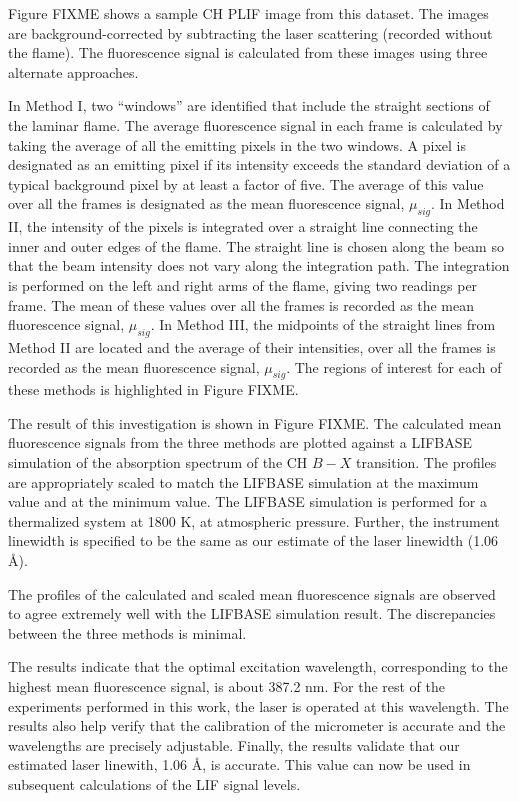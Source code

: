 Figure FIXME shows a sample CH PLIF image from this dataset.
The images are background-corrected by subtracting the laser scattering (recorded without the flame).
The fluorescence signal is calculated from these images using three alternate approaches.

In Method I, two ``windows'' are identified that include the straight sections of the laminar flame.
The average fluorescence signal in each frame is calculated by taking the average of all the emitting pixels in the two windows.
A pixel is designated as an emitting pixel if its intensity exceeds the standard deviation of a typical background pixel by at least a factor of five.
The average of this value over all the frames is designated as the mean fluorescence signal, \(\mu_{sig}\).
In Method II, the intensity of the pixels is integrated over a straight line connecting the inner and outer edges of the flame.
The straight line is chosen along the beam so that the beam intensity does not vary along the integration path.
The integration is performed on the left and right arms of the flame, giving two readings per frame.
The mean of these values over all the frames is recorded as the mean fluorescence signal, \(\mu_{sig}\).
In Method III, the midpoints of the straight lines from Method II are located and the average of their intensities, over all the frames is recorded as the mean fluorescence signal, \(\mu_{sig}\).
The regions of interest for each of these methods is highlighted in Figure FIXME.

The result of this investigation is shown in Figure FIXME.
The calculated mean fluorescence signals from the three methods are plotted against a LIFBASE simulation of the absorption spectrum of the CH \(B-X\) transition.
The profiles are appropriately scaled to match the LIFBASE simulation at the maximum value and at the minimum value.
The LIFBASE simulation is performed for a thermalized system at 1800 K, at atmospheric pressure.
Further, the instrument linewidth is specified to be the same as our estimate of the laser linewidth (1.06 \AA).

The profiles of the calculated and scaled mean fluorescence signals are observed to agree extremely well with the LIFBASE simulation result.
The discrepancies between the three methods is minimal.

The results indicate that the optimal excitation wavelength, corresponding to the highest mean fluorescence signal, is about 387.2 nm.
For the rest of the experiments performed in this work, the laser is operated at this wavelength.
The results also help verify that the calibration of the micrometer is accurate and the wavelengths are precisely adjustable.
Finally, the results validate that our estimated laser linewith, 1.06 \AA, is accurate.
This value can now be used in subsequent calculations of the LIF signal levels.

